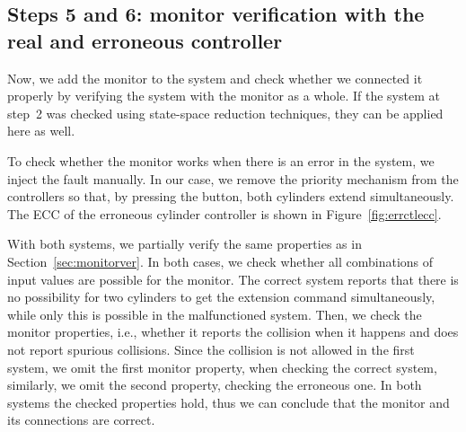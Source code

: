 \begin{bibunit}



\subsection{Steps 5 and 6: monitor verification with the real and erroneous controller}

Now, we add the monitor to the system and check whether we connected it properly by verifying the system with the monitor as a whole. If the system at step~2 was checked using state-space reduction techniques, they can be applied here as well.

To check whether the monitor works when there is an error in the system, we inject the fault manually. In our case, we remove the priority mechanism from the controllers so that, by pressing the button, both cylinders extend simultaneously. The ECC of the erroneous cylinder controller is shown in Figure~\ref{fig:errctlecc}.

With both systems, we partially verify the same properties as in Section~\ref{sec:monitorver}. In both cases, we check whether all combinations of input values are possible for the monitor. The correct system reports that there is no possibility for two cylinders to get the extension command simultaneously, while only this is possible in the malfunctioned system. Then, we check the monitor properties, i.e., whether it reports the collision when it happens and does not report spurious collisions. Since the collision is not allowed in the first system, we omit the first monitor property, when checking the correct system, similarly, we omit the second property, checking the erroneous one. In both systems the checked properties hold, thus we can conclude that the monitor and its connections are correct.



\end{bibunit}
